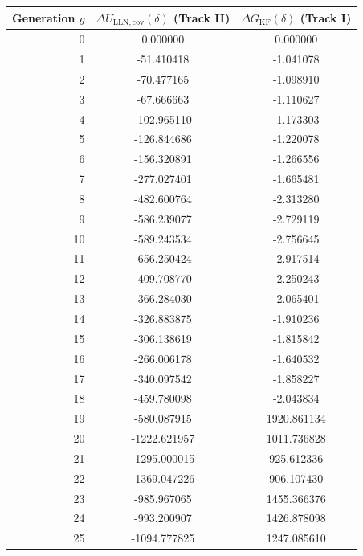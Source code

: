 \documentclass{article}
\theoremstyle{plain}
\theoremstyle{definition}
\theoremstyle{remark}
\begin{document}
\begin{table}[ht!]
\scriptsize
\setlength{\tabcolsep}{7pt}
\begin{minipage}[t]{0.4\textwidth}
\vspace{0pt}
\begin{tabular}{rcc}
\toprule
Generation $g$ & $\Delta U_{\mathrm{LLN,cov}}(\delta)$ (Track II) & $\Delta G_{\mathrm{KF}}(\delta)$ (Track I) \\
\midrule
0 & 0.000000 & 0.000000 \\
1 & -51.410418 & -1.041078 \\
2 & -70.477165 & -1.098910 \\
3 & -67.666663 & -1.110627 \\
4 & -102.965110 & -1.173303 \\
5 & -126.844686 & -1.220078 \\
6 & -156.320891 & -1.266556 \\
7 & -277.027401 & -1.665481 \\
8 & -482.600764 & -2.313280 \\
9 & -586.239077 & -2.729119 \\
10 & -589.243534 & -2.756645 \\
11 & -656.250424 & -2.917514 \\
12 & -409.708770 & -2.250243 \\
13 & -366.284030 & -2.065401 \\
14 & -326.883875 & -1.910236 \\
15 & -306.138619 & -1.815842 \\
16 & -266.006178 & -1.640532 \\
17 & -340.097542 & -1.858227 \\
18 & -459.780098 & -2.043834 \\
19 & -580.087915 & 1920.861134 \\
20 & -1222.621957 & 1011.736828 \\
21 & -1295.000015 & 925.612336 \\
22 & -1369.047226 & 906.107430 \\
23 & -985.967065 & 1455.366376 \\
24 & -993.200907 & 1426.878098 \\
25 & -1094.777825 & 1247.085610 \\
\bottomrule
\end{tabular}
\end{minipage}
\hspace{2cm}
\begin{minipage}[t]{0.4\textwidth}
\vspace{0pt}

\end{minipage}
\end{table}
\end{document}
